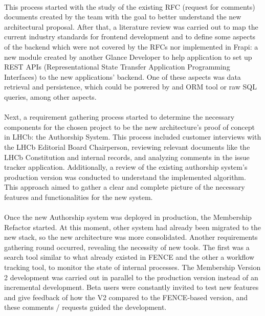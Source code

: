 \paragraph{} This process started with the study of the existing RFC (request for comments) documents created by the team with the goal to better understand the new architectural proposal. After that, a literature review was carried out to map the current industry standards for frontend development and to define some aspects of the backend which were not covered by the RFCs nor implemented in Frapi: a new module created by another Glance Developer to help application to set up REST APIs (Representational State Transfer Application Programming Interfaces) to the new applications' backend. One of these aspects was data retrieval and persistence, which could be powered by and ORM tool or raw SQL queries, among other aspects. 

\paragraph{} Next, a requirement gathering process started to determine the necessary components for the chosen project to be the new architecture's proof of concept in LHCb: the Authorship System. This process included customer interviews with the LHCb Editorial Board Chairperson, reviewing relevant documents like the LHCb Constitution and internal records, and analyzing comments in the issue tracker application. Additionally, a review of the existing authorship system's production version was conducted to understand the implemented algorithm. This approach aimed to gather a clear and complete picture of the necessary features and functionalities for the new system.

\paragraph{} Once the new Authorship system was deployed in production, the Membership Refactor started. At this moment, other system had already been migrated to the new stack, so the new architecture was more consolidated. Another requirements gathering round occurred, revealing the necessity of new tools. The first was a search tool similar to what already existed in FENCE and the other a workflow tracking tool, to monitor the state of internal processes. The Membership Version 2 development was carried out in parallel to the production version instead of an incremental development. Beta users were constantly invited to test new features and give feedback of how the V2 compared to the FENCE-based version, and these comments / requests guided the development.


